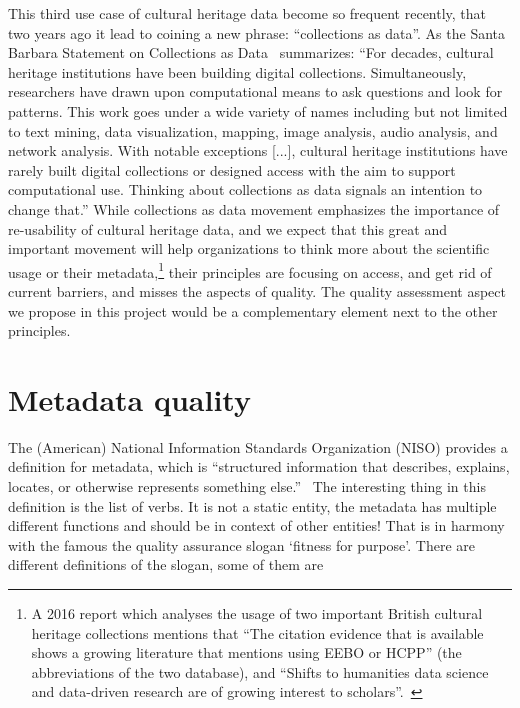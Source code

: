 This third use case of cultural heritage data become so frequent recently, that two years ago it lead to coining a new phrase: ``collections as data''. As the Santa Barbara Statement on Collections as Data~\cite{santabarbarastatement2017} summarizes: ``For decades, cultural heritage institutions have been building digital collections. Simultaneously, researchers have drawn upon computational means to ask questions and look for patterns. This work goes under a wide variety of names including but not limited to text mining, data visualization, mapping, image analysis, audio analysis, and network analysis. With notable exceptions [...], cultural heritage institutions have rarely built digital collections or designed access with the aim to support computational use. Thinking about collections as data signals an intention to change that.'' While collections as data movement emphasizes the importance of re-usability of cultural heritage data, and we expect that this great and important movement will help organizations to think more about the scientific usage or their metadata,\footnote{A 2016 report which analyses the usage of two important British cultural heritage collections mentions that ``The citation evidence that is available shows a growing literature that mentions using EEBO or HCPP'' (the abbreviations of the two database), and ``Shifts to humanities data science and data-driven research are of growing interest to scholars''.~\cite{meyer2016}} their principles are focusing on access, and get rid of current barriers, and misses the aspects of quality. The quality assessment aspect we propose in this project would be a complementary element next to the other principles.

\section{Metadata quality}


The (American) National Information Standards Organization (NISO) provides a definition for metadata, which is ``structured information that describes, explains, locates, or otherwise represents something else.''~\cite{framework2007} The interesting thing in this definition is the list of verbs. It is not a static entity, the metadata has multiple different functions and should be in context of other entities! That is in harmony with the famous the quality assurance slogan `fitness for purpose'. There are different definitions of the slogan, some of them are

